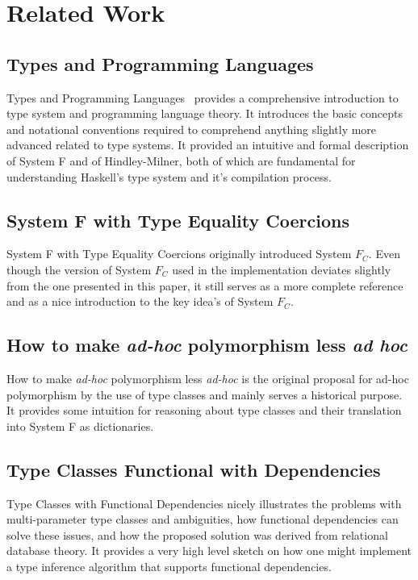 \section{Related Work}

\subsection{Types and Programming Languages}

Types and Programming Languages~\cite{pierce2002types} provides a comprehensive
introduction to type system and programming
language theory. It introduces the basic concepts and notational conventions
required to comprehend anything slightly more advanced related to type systems.
It provided an intuitive and formal description of System F and of
Hindley-Milner, both of which are fundamental for understanding Haskell's type
system and it's compilation process.

\subsection{System F with Type Equality Coercions}

System F with Type Equality Coercions\cite{Sulzmann:2007:SFT:1190315.1190324}
originally introduced System $F_C$. Even though the version of System $F_C$ used
in the implementation deviates slightly from the one presented in this paper, it
still serves as a more complete reference and as a nice introduction to the key
idea's of System $F_C$.

\subsection{How to make \textit{ad-hoc} polymorphism less \textit{ad hoc}}

How to make \textit{ad-hoc} polymorphism less
\textit{ad-hoc}\cite{Wadler:1989:MAP:75277.75283} is the original
proposal for ad-hoc polymorphism by the use of type classes and mainly serves a
historical purpose. It provides some intuition for reasoning about type classes
and their translation into System F as dictionaries.

\subsection{Type Classes Functional with Dependencies}

Type Classes with Functional Dependencies\cite{Jones00typeclasses} nicely
illustrates the problems with multi-parameter type classes and ambiguities, how
functional dependencies can solve these issues, and how the proposed solution
was derived from relational database theory. It provides a very high level
sketch on how one might implement a type inference algorithm that supports
functional dependencies.

